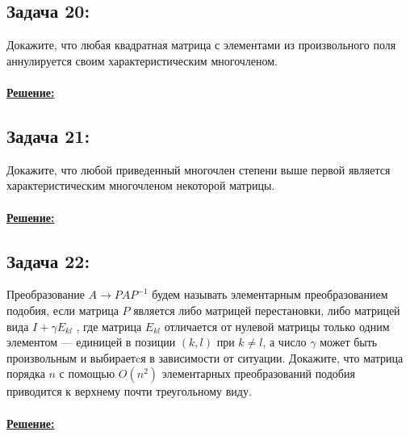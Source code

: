 \documentclass[a4paper,12pt,titlepage,final]{article}
\begin{document}
\subsection*{Задача 20:}
\noindent Докажите, что любая квадратная матрица с элементами из произвольного поля аннулируется
своим характеристическим многочленом. \\ \\
\textbf{\underline{Решение:}} \\


\subsection*{Задача 21:}
\noindent Докажите, что любой приведенный многочлен степени выше первой является характеристическим многочленом некоторой матрицы. \\ \\
\textbf{\underline{Решение:}} \\


\subsection*{Задача 22:}
\noindent Преобразование $A \rightarrow PAP^{-1}$ будем называть элементарным преобразованием подобия, если
матрица $P$ является либо матрицей перестановки, либо матрицей вида $I + \gamma E_{kl}$ , где матрица
$E_{kl}$ отличается от нулевой матрицы только одним элементом — единицей в позиции $(k,l)$ при
$k \neq l$, а число $\gamma$ может быть произвольным и выбираетcя в зависимости от ситуации. Докажите,
что матрица порядка $n$ с помощью $O(n^2)$ элементарных преобразований подобия приводится к
верхнему почти треугольному виду. \\ \\
\textbf{\underline{Решение:}} \\


\end{document}
